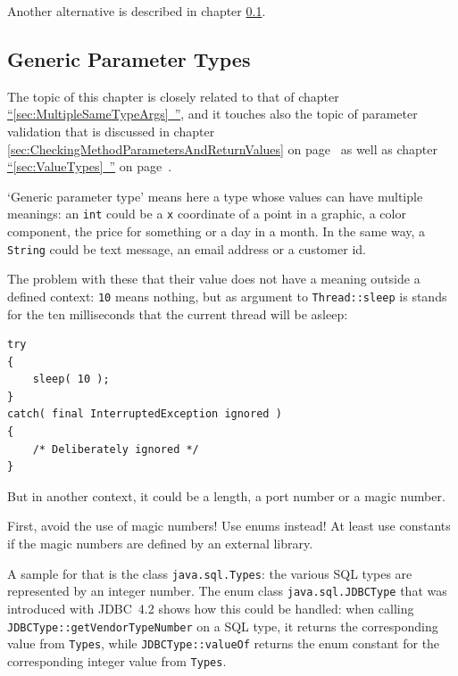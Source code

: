 \documentclass[11pt,a4paper, titlepage, parskip=half, headsepline, footsepline, cleardoublepage=current, headheight=1cm]{scrbook}
\newcommand*{\tqfullref}[1]{\hyperref[{#1}]{“\ref*{#1}~\nameref*{#1}”}}
\newcommand*{\tqfullvref}[1]{\hyperref[{#1}]{“\ref*{#1}~\nameref*{#1}”} on page~\pageref{#1}}
\newcommand*{\tqref}[1]{\hyperref[{#1}]{\ref*{#1}}}
\newcommand*{\tqvref}[1]{\hyperref[{#1}]{\ref*{#1}} on page~\pageref{#1}}
\begin{document}
Another alternative is described in chapter \tqref{sec:GenericParameterTypes}.


\subsection{Generic Parameter Types}\label{sec:GenericParameterTypes}
The topic of this chapter is closely related to that of chapter \tqfullref{sec:MultipleSameTypeArgs}, and it touches also the topic of parameter validation that is discussed in chapter \tqvref{sec:CheckingMethodParametersAndReturnValues} as well as chapter \tqfullvref{sec:ValueTypes}.

‘Generic parameter type’ means here a type whose values can have multiple meanings: an \lstinline|int| could be a \verb#x# coordinate of a point in a graphic, a color component, the price for something or a day in a month. In the same way, a \lstinline|String| could be text message, an email address or a customer id.

The problem with these that their value does not have a meaning outside a defined context: \lstinline|10| means nothing, but as argument to \lstinline|Thread::sleep|\autocite{ORACLE_DOC_THREAD:sleep} is stands for the ten milliseconds that the current thread will be asleep:
\begin{lstlisting}
try
{
    sleep( 10 );
}
catch( final InterruptedException ignored )
{
    /* Deliberately ignored */
}    
\end{lstlisting}
But in another context, it could be a length, a port number or a magic number.

First, avoid the use of magic numbers! Use enums instead! At least use constants if the magic numbers are defined by an external library.

A sample for that is the class \lstinline|java.sql.Types|\autocite{ORACLE_DOC_TYPES_CLASS}: the various SQL types are represented by an integer number. The enum class \lstinline|java.sql.JDBCType|\autocite{ORACLE_DOC_JDBCTYPE_ENUM} that was introduced with JDBC~4.2 shows how this could be handled: when calling \lstinline|JDBCType::getVendorTypeNumber|\autocite{ORACLE_DOC_JDBCTYPE:getVendorTypeNumber} on a SQL type, it returns the corresponding value from \lstinline|Types|, while \lstinline|JDBCType::valueOf|\autocite{ORACLE_DOC_JDBCTYPE:valueOf} returns the enum constant for the corresponding integer value from \lstinline|Types|.
\end{document}
